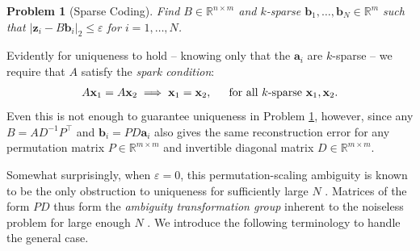 \documentclass[journal, twocolumn]{IEEEtran}
\newtheorem{problem}{Problem}
\begin{document}
\begin{problem}[Sparse Coding]\label{InverseProblem}
Find $B \in \mathbb{R}^{n \times m}$ and $k$-sparse $\mathbf{b}_1, \ldots, \mathbf{b}_N \in \mathbb{R}^m$ such that $|\mathbf{z}_i - B\mathbf{b}_i|_2 \leq \varepsilon$ for $i = 1, \ldots, N$.
\end{problem}


Evidently for uniqueness to hold -- knowing only that the $\mathbf{a}_i$ are $k$-sparse -- we require that $A$ satisfy the \textit{spark condition}:
\begin{align}\label{SparkCondition}
A\mathbf{x}_1 = A\mathbf{x}_2 \implies \mathbf{x}_1 = \mathbf{x}_2,\indent \text{for all $k$-sparse } \mathbf{x}_1, \mathbf{x}_2.
\end{align}
Even this is not enough to guarantee uniqueness in Problem \ref{InverseProblem}, however, since any $B = AD^{-1}P^{\top}$ and $\mathbf{b}_i = PD\mathbf{a}_i$ also gives the same reconstruction error for any permutation matrix $P \in \mathbb{R}^{m \times m}$ and invertible diagonal matrix $D \in \mathbb{R}^{m \times m}$. 

Somewhat surprisingly, when $\varepsilon = 0$, this permutation-scaling ambiguity is known to be the only obstruction to uniqueness for sufficiently large $N$ \cite{li2004analysis, Georgiev05, Aharon06, Hillar15}. Matrices of the form $PD$ thus form the \emph{ambiguity transformation group} inherent to the noiseless problem for large enough $N$ \cite{Li15}. We introduce the following terminology to handle the general case.
\end{document}
